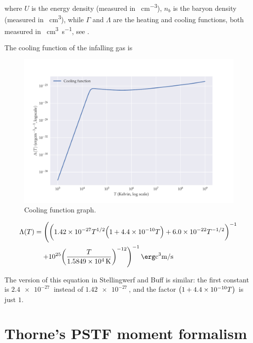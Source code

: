 \documentclass[main.tex]{subfiles}
\begin{document}
where \(U\) is the energy density (measured in \si{\erg\per\cubic\centi\metre}), \(n_b\) is the baryon density (measured in \si{\per\cubic\centi\metre}), while \(\Gamma\) and \(\Lambda\) are the heating and cooling functions, both measured in \si{\erg\cubic\centi\metre\per\second}, see \cite[equation 1]{Gnedin:2012}.

The cooling function of the infalling gas is

\begin{figure}
    \centering
    \includegraphics[width=\textwidth]{figures/cooling_function.pdf}
    \caption{Cooling function graph.}
    \label{fig:cooling-function}
\end{figure}

\begin{equation}
    \begin{split}
    \Lambda (T) &= \left(
    \qty(
    \num{1.42e-27}T^{1/2} \qty(
    1 + \num{4.4e-10}T
    ) + \num{6.0e-22}T^{-1/2}
    )^{-1} \right. \\
    & \quad \left. + \num{e25} \qty(\frac{T}{\SI{1.5849e4}{K}})^{-12}
    \right)^{-1} \si{\erg\cubic\centi\metre\per\second}
    \end{split}
\end{equation}

The version of this equation in Stellingwerf and Buff is similar: the first constant is \(\SI{2.4e-27}{} \) instead of \(\SI{1.42e-27}{} \), and the factor \(\qty(1 + \SI{4.4e-10}{}T)\) is just \(1\).

\section{Thorne's PSTF moment formalism}
\end{document}
